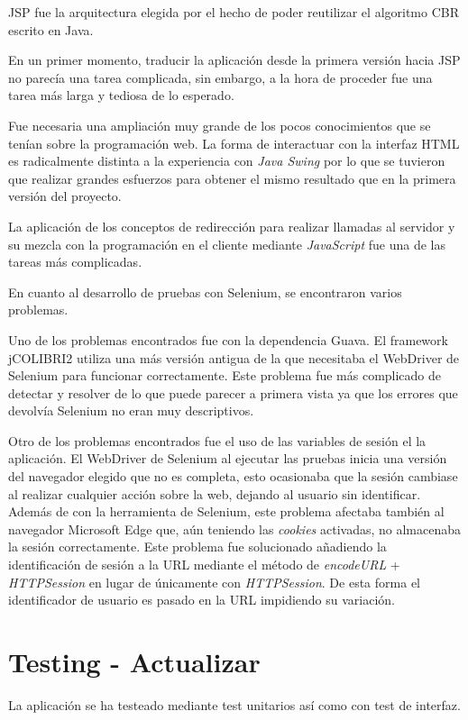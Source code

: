 JSP fue la arquitectura elegida por el hecho de poder reutilizar el algoritmo CBR escrito en Java.

En un primer momento, traducir la aplicación desde la primera versión hacia JSP no parecía una tarea complicada, sin embargo, a la hora de proceder fue una tarea más larga y tediosa de lo esperado.

Fue necesaria una ampliación muy grande de los pocos conocimientos que se tenían sobre la programación web. La forma de interactuar con la interfaz HTML es radicalmente distinta a la experiencia con \emph{Java Swing} por lo que se tuvieron que realizar grandes esfuerzos para obtener el mismo resultado que en la primera versión del proyecto.

La aplicación de los conceptos de redirección para realizar llamadas al servidor y su mezcla con la programación en el cliente mediante \emph{JavaScript} fue una de las tareas más complicadas.

En cuanto al desarrollo de pruebas con Selenium, se encontraron varios problemas.

Uno de los problemas encontrados fue con la dependencia Guava. El framework jCOLIBRI2 utiliza una más versión antigua de la que necesitaba el WebDriver de Selenium para funcionar correctamente. Este problema fue más complicado de detectar y resolver de lo que puede parecer a primera vista ya que los errores que devolvía Selenium no eran muy descriptivos.

Otro de los problemas encontrados fue el uso de las variables de sesión el la aplicación. El WebDriver de Selenium al ejecutar las pruebas inicia una versión del navegador elegido que no es completa, esto ocasionaba que la sesión cambiase al realizar cualquier acción sobre la web, dejando al usuario sin identificar. Además de con la herramienta de Selenium, este problema afectaba también al navegador Microsoft Edge que, aún teniendo las \emph{cookies} activadas, no almacenaba la sesión correctamente. Este problema fue solucionado añadiendo la identificación de sesión a la URL mediante el método de \emph{encodeURL} + \emph{HTTPSession} en lugar de únicamente con \emph{HTTPSession}. De esta forma el identificador de usuario es pasado en la URL impidiendo su variación.


\section{Testing - Actualizar}

La aplicación se ha testeado mediante test unitarios así como con test de interfaz.

